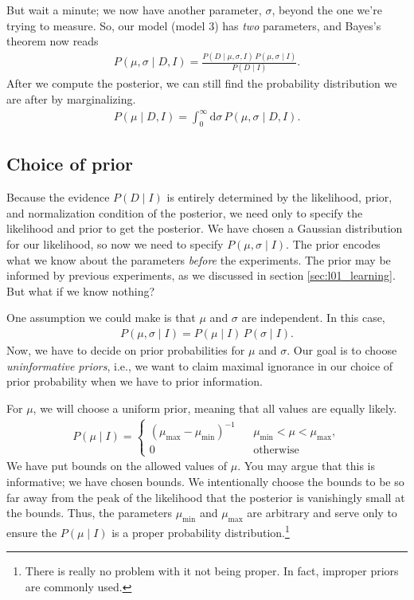 But wait a minute; we now have another parameter, $\sigma$, beyond the
one we're trying to measure.  So, our model (model 3) has \textit{two}
parameters, and Bayes's theorem now reads
\begin{align}
P(\mu, \sigma \mid D, I) = \frac{P(D\mid \mu, \sigma, I)\,P(\mu, \sigma \mid I)}
{P(D\mid I)}.
\end{align}
After we compute the posterior, we can still find the probability
distribution we are after by marginalizing.
\begin{align}
P(\mu\mid D, I) = \int_0^\infty \mathrm{d}\sigma\,P(\mu, \sigma \mid D, I).
\end{align}


\subsection{Choice of prior}
Because the evidence $P(D\mid I)$ is entirely determined by the
likelihood, prior, and normalization condition of the posterior, we
need only to specify the likelihood and prior to get the posterior.
We have chosen a Gaussian distribution for our likelihood, so now we
need to specify $P(\mu, \sigma \mid I)$.  The prior encodes what we
know about the parameters \textit{before} the experiments.  The prior
may be informed by previous experiments, as we discussed in section
\ref{sec:l01_learning}.  But what if we know nothing?

One assumption we could make is that $\mu$ and $\sigma$ are
independent.  In this case,
\begin{align}
P(\mu, \sigma \mid I) = P(\mu \mid I)\,P(\sigma\mid I).
\end{align}
Now, we have to decide on prior probabilities for $\mu$ and $\sigma$.
Our goal is to choose \textit{uninformative priors}, i.e., we want to
claim maximal ignorance in our choice of prior probability when we
have to prior information.

For $\mu$, we will choose a uniform prior, meaning that all values are
equally likely.
\begin{align}
P(\mu\mid I) = \left\{\begin{array}{ccl}
\left(\mu_\mathrm{max} - \mu_\mathrm{min}\right)^{-1} & & \mu_\mathrm{min} < \mu < \mu_\mathrm{max}, \\[1em]
0 & & \text{otherwise}
\end{array}\right.
\end{align}
We have put bounds on the allowed values of $\mu$.  You may argue that
this is informative; we have chosen bounds.  We intentionally choose
the bounds to be so far away from the peak of the likelihood that the
posterior is vanishingly small at the bounds.  Thus, the parameters
$\mu_\mathrm{min}$ and $\mu_\mathrm{max}$ are arbitrary and serve only
to ensure the $P(\mu \mid I)$ is a proper probability
distribution.\footnote{There is really no problem with it not being
  proper.  In fact, improper priors are commonly used.}

